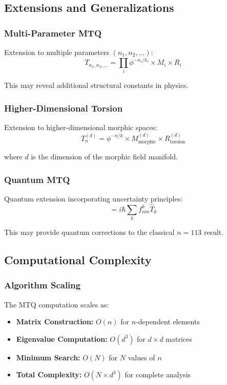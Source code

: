 \subsection{Extensions and Generalizations}

\subsubsection{Multi-Parameter MTQ}

Extension to multiple parameters $(n_1, n_2, \ldots)$:
\begin{equation}
T_{n_1,n_2,...} = \prod_{i} \phi^{-n_i/k_i} \times M_i \times R_i
\end{equation}

This may reveal additional structural constants in physics.

\subsubsection{Higher-Dimensional Torsion}

Extension to higher-dimensional morphic spaces:
\begin{equation}
T_n^{(d)} = \phi^{-n/k} \times M_{\text{morphic}}^{(d)} \times R_{\text{torsion}}^{(d)}
\end{equation}

where $d$ is the dimension of the morphic field manifold.

\subsubsection{Quantum MTQ}

Quantum extension incorporating uncertainty principles:
\begin{equation}
[\hat{T}_n, \hat{T}_m] = i\hbar \sum_{k} f_{nm}^k \hat{T}_k
\end{equation}

This may provide quantum corrections to the classical $n = 113$ result.

\subsection{Computational Complexity}

\subsubsection{Algorithm Scaling}

The MTQ computation scales as:
\begin{itemize}
\item \textbf{Matrix Construction:} $O(n)$ for $n$-dependent elements
\item \textbf{Eigenvalue Computation:} $O(d^3)$ for $d \times d$ matrices
\item \textbf{Minimum Search:} $O(N)$ for $N$ values of $n$
\item \textbf{Total Complexity:} $O(N \times d^3)$ for complete analysis
\end{itemize}

